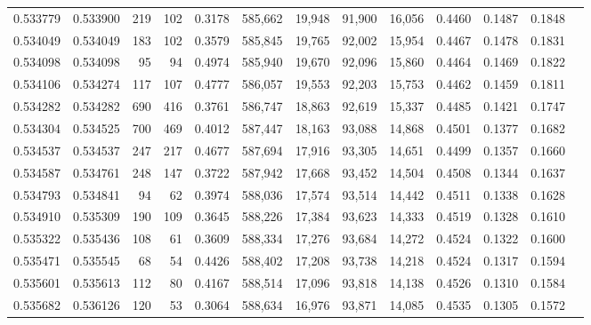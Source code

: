 \begin{tabular}{rrrrrrrrrrrrr}
0.533779 & 0.533900 &   219 &   102 &                                     0.3178 & 585,662 &  19,948 &  91,900 &  16,056 & 0.4460 & 0.1487 & 0.1848 \\
0.534049 & 0.534049 &   183 &   102 &                                     0.3579 & 585,845 &  19,765 &  92,002 &  15,954 & 0.4467 & 0.1478 & 0.1831 \\
0.534098 & 0.534098 &    95 &    94 &                                     0.4974 & 585,940 &  19,670 &  92,096 &  15,860 & 0.4464 & 0.1469 & 0.1822 \\
0.534106 & 0.534274 &   117 &   107 &                                     0.4777 & 586,057 &  19,553 &  92,203 &  15,753 & 0.4462 & 0.1459 & 0.1811 \\
0.534282 & 0.534282 &   690 &   416 &                                     0.3761 & 586,747 &  18,863 &  92,619 &  15,337 & 0.4485 & 0.1421 & 0.1747 \\
0.534304 & 0.534525 &   700 &   469 &                                     0.4012 & 587,447 &  18,163 &  93,088 &  14,868 & 0.4501 & 0.1377 & 0.1682 \\
0.534537 & 0.534537 &   247 &   217 &                                     0.4677 & 587,694 &  17,916 &  93,305 &  14,651 & 0.4499 & 0.1357 & 0.1660 \\
0.534587 & 0.534761 &   248 &   147 &                                     0.3722 & 587,942 &  17,668 &  93,452 &  14,504 & 0.4508 & 0.1344 & 0.1637 \\
0.534793 & 0.534841 &    94 &    62 &                                     0.3974 & 588,036 &  17,574 &  93,514 &  14,442 & 0.4511 & 0.1338 & 0.1628 \\
0.534910 & 0.535309 &   190 &   109 &                                     0.3645 & 588,226 &  17,384 &  93,623 &  14,333 & 0.4519 & 0.1328 & 0.1610 \\
0.535322 & 0.535436 &   108 &    61 &                                     0.3609 & 588,334 &  17,276 &  93,684 &  14,272 & 0.4524 & 0.1322 & 0.1600 \\
0.535471 & 0.535545 &    68 &    54 &                                     0.4426 & 588,402 &  17,208 &  93,738 &  14,218 & 0.4524 & 0.1317 & 0.1594 \\
0.535601 & 0.535613 &   112 &    80 &                                     0.4167 & 588,514 &  17,096 &  93,818 &  14,138 & 0.4526 & 0.1310 & 0.1584 \\
0.535682 & 0.536126 &   120 &    53 &                                     0.3064 & 588,634 &  16,976 &  93,871 &  14,085 & 0.4535 & 0.1305 & 0.1572 \\

\end{tabular}
